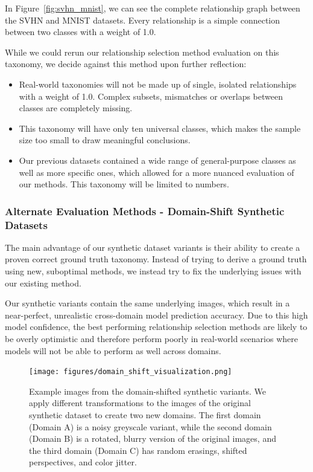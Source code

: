 In Figure~\ref{fig:svhn_mnist}, we can see the complete relationship graph between the SVHN and MNIST datasets.
Every relationship is a simple connection between two classes with a weight of 1.0.

While we could rerun our relationship selection method evaluation on this taxonomy,
we decide against this method upon further reflection:
\begin{itemize}
      \item Real-world taxonomies will not be made up of single, isolated relationships
            with a weight of 1.0. Complex subsets, mismatches or overlaps between classes are completely missing.
      \item This taxonomy will have only ten universal classes, which makes the sample size too small to draw meaningful conclusions.
      \item Our previous datasets contained a wide range of general-purpose classes as well as more specific ones, which allowed for a more nuanced evaluation of our methods.
            This taxonomy will be limited to numbers.
\end{itemize}

\subsubsection{Alternate Evaluation Methods - Domain-Shift Synthetic Datasets}

The main advantage of our synthetic dataset variants is their ability to create a proven correct ground truth taxonomy.
Instead of trying to derive a ground truth using new, suboptimal methods,
we instead try to fix the underlying issues with our existing method.

Our synthetic variants contain the same underlying images,
which result in a near-perfect, unrealistic cross-domain model prediction accuracy.
Due to this high model confidence, the best performing relationship selection methods are likely to be overly optimistic
and therefore perform poorly in real-world scenarios where models will not be able to perform as well across domains.


\begin{figure}[ht]
      \centering
      \texttt{[image: figures/domain\_shift\_visualization.png]}

      \caption{Example images from the domain-shifted synthetic variants.
            We apply different transformations to the images of the original synthetic dataset
            to create two new domains. The first domain (Domain A) is a noisy greyscale variant,
            while the second domain (Domain B) is a rotated, blurry version of the original images,
            and the third domain (Domain C) has random erasings, shifted perspectives, and color jitter.}
      \label{fig:domain_shift}
\end{figure}

